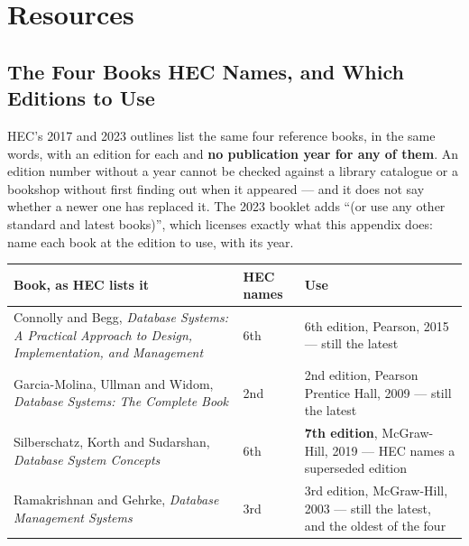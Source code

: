 \chapter{Resources}\label{app:resources}
\normalfigures

\section{The Four Books HEC Names, and Which Editions to Use}

HEC's 2017 and 2023 outlines list the same four reference books, in the same
words, with an edition for each and \textbf{no publication year for any of
them}. An edition number without a year cannot be checked against a library
catalogue or a bookshop without first finding out when it appeared --- and it
does not say whether a newer one has replaced it. The 2023 booklet adds
``(or use any other standard and latest books)'', which licenses exactly what
this appendix does: name each book at the edition to use, with its year.

\medskip
\begin{longtable}{@{}L{6.2cm}L{2.4cm}L{5.4cm}@{}}
\toprule
{}
\textbf{Book, as HEC lists it} & \textbf{HEC names} & \textbf{Use} \\
\midrule
\endhead
Connolly and Begg, \emph{Database Systems: A Practical Approach to Design,
Implementation, and Management} & 6th & 6th edition, Pearson, 2015 --- still
the latest \\
Garcia-Molina, Ullman and Widom, \emph{Database Systems: The Complete Book} &
2nd & 2nd edition, Pearson Prentice Hall, 2009 --- still the latest \\
Silberschatz, Korth and Sudarshan, \emph{Database System Concepts} & 6th &
\textbf{7th edition}, McGraw-Hill, 2019 --- HEC names a superseded edition \\
Ramakrishnan and Gehrke, \emph{Database Management Systems} & 3rd & 3rd
edition, McGraw-Hill, 2003 --- still the latest, and the oldest of the four \\
\bottomrule
\end{longtable}

